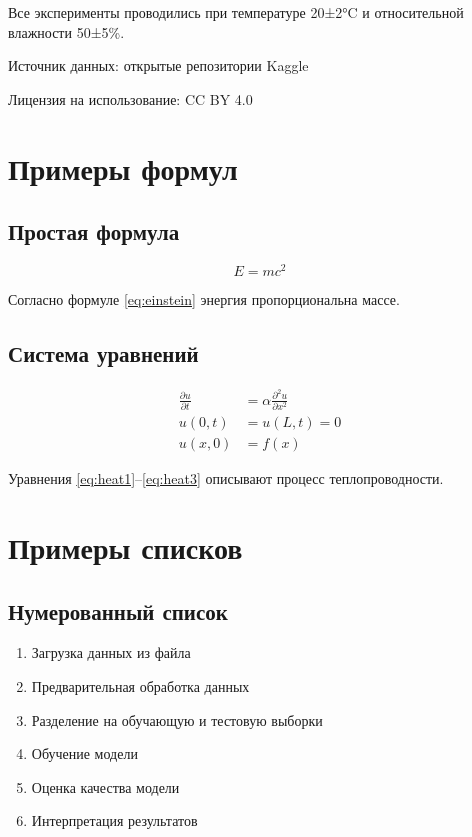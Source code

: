 \begin{notes}
    \item Все эксперименты проводились при температуре 20±2°C и относительной влажности 50±5\%.
\end{notes}

\begin{notes}
    \item Источник данных: открытые репозитории Kaggle
    \item Лицензия на использование: CC BY 4.0
\end{notes}

\section{Примеры формул}

\subsection{Простая формула}

\begin{equation}
E = mc^2
\label{eq:einstein}
\end{equation}

Согласно формуле \ref{eq:einstein} энергия пропорциональна массе.

\subsection{Система уравнений}

\begin{align}
\frac{\partial u}{\partial t} &= \alpha \frac{\partial^2 u}{\partial x^2} \label{eq:heat1} \\
u(0,t) &= u(L,t) = 0 \label{eq:heat2} \\
u(x,0) &= f(x) \label{eq:heat3}
\end{align}

Уравнения \ref{eq:heat1}--\ref{eq:heat3} описывают процесс теплопроводности.

\section{Примеры списков}

\subsection{Нумерованный список}

\begin{enumerate}
\item Загрузка данных из файла
\item Предварительная обработка данных
\item Разделение на обучающую и тестовую выборки
\item Обучение модели
\item Оценка качества модели
\item Интерпретация результатов
\end{enumerate}

